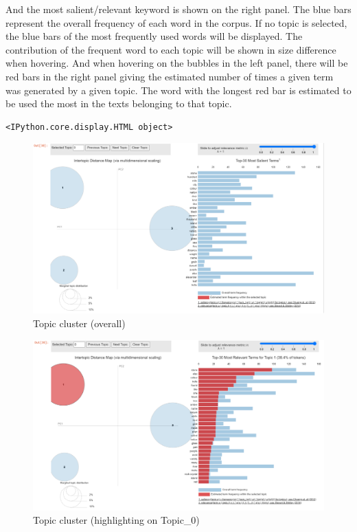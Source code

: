 \documentclass[
  12pt,
]{article}
\begin{document}
And the most salient/relevant keyword is shown on the right panel. The
blue bars represent the overall frequency of each word in the corpus. If
no topic is selected, the blue bars of the most frequently used words
will be displayed. The contribution of the frequent word to each topic
will be shown in size difference when hovering. And when hovering on the
bubbles in the left panel, there will be red bars in the right panel
giving the estimated number of times a given term was generated by a
given topic. The word with the longest red bar is estimated to be used
the most in the texts belonging to that topic.

\begin{verbatim}
<IPython.core.display.HTML object>
\end{verbatim}

\begin{figure}

{\centering \includegraphics{NHthesis_structure_files/figure-pdf/fig-topic_cluster0-output-1.png}

}

\caption{\label{fig-topic_cluster0}Topic cluster (overall)}

\end{figure}

\begin{figure}

{\centering \includegraphics{NHthesis_structure_files/figure-pdf/fig-topic_cluster1-output-1.png}

}

\caption{\label{fig-topic_cluster1}Topic cluster (highlighting on
Topic\_0)}

\end{figure}
\end{document}
